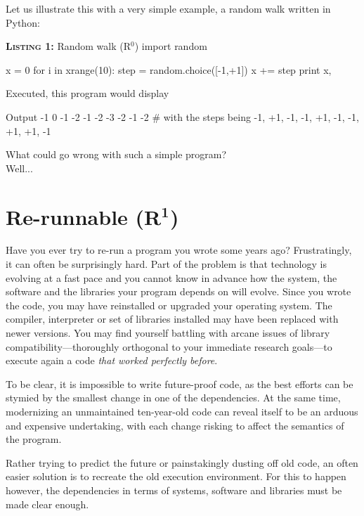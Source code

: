 \documentclass[a4paper,11pt]{article}
\begin{document}
Let us illustrate this with a very simple example,
a random walk written in Python:

\begin{code}{\textbf{\textsc{Listing 1:}} Random walk (R$^0$)}
import random

x = 0
for i in xrange(10):
    step = random.choice([-1,+1])
    x += step
    print x,
\end{code}

Executed, this program would display 
\begin{code}{Output}
-1  0 -1 -2 -1 -2 -3 -2 -1 -2 # with the steps being -1, +1, -1, -1, +1, -1, -1, +1, +1, -1
\end{code}

What could go wrong with such a simple program?\\
\vfill
Well...
\vfill


\clearpage
\section*{Re-runnable (R$^{\mathbf 1}$)}

Have you ever try to re-run a program you wrote some years ago?
Frustratingly, it can often be surprisingly hard. 
Part of the problem is that technology is evolving at a fast pace
and you cannot  know in advance
how the system, the software and the libraries your program depends on will evolve.
Since you wrote the code,
you may have reinstalled or upgraded  your operating system.
The compiler, interpreter or set of libraries installed may have been replaced with newer versions. 
You may find yourself battling with
arcane issues of library compatibility---thoroughly orthogonal to your immediate research  goals---to execute again a code \emph{that worked perfectly before}. 

To be clear, it is impossible to write future-proof code,
as the best efforts can be stymied by the smallest change in one of the dependencies.
At the same time, modernizing an unmaintained ten-year-old code
can reveal itself to be an arduous and expensive undertaking,
with each change risking to affect the semantics of the program.

Rather trying to predict the future or painstakingly dusting off old code, 
an often easier solution is to recreate the old execution environment.
For this to happen however, 
the dependencies in terms of systems, software and libraries must be made clear enough.
\end{document}
